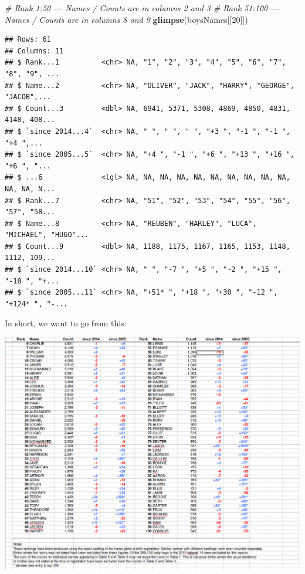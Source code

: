 \documentclass[
]{book}
\newenvironment{Shaded}{\begin{snugshade}}{\end{snugshade}}
\newcommand{\CommentTok}[1]{\textcolor[rgb]{0.56,0.35,0.01}{\textit{#1}}}
\newcommand{\DecValTok}[1]{\textcolor[rgb]{0.00,0.00,0.81}{#1}}
\newcommand{\KeywordTok}[1]{\textcolor[rgb]{0.13,0.29,0.53}{\textbf{#1}}}
\newcommand{\NormalTok}[1]{#1}
\begin{document}
\begin{Shaded}
\begin{Highlighting}[]
\CommentTok{\# Rank 1:50 {-}{-}{-} Names / Counts are in columns 2 and 3 }
\CommentTok{\# Rank 51:100 {-}{-}{-} Names / Counts are in columns 8 and 9}
\KeywordTok{glimpse}\NormalTok{(boysNames[[}\DecValTok{20}\NormalTok{]]) }
\end{Highlighting}
\end{Shaded}

\begin{verbatim}
## Rows: 61
## Columns: 11
## $ Rank...1          <chr> NA, "1", "2", "3", "4", "5", "6", "7", "8", "9", ...
## $ Name...2          <chr> NA, "OLIVER", "JACK", "HARRY", "GEORGE", "JACOB",...
## $ Count...3         <dbl> NA, 6941, 5371, 5308, 4869, 4850, 4831, 4148, 408...
## $ `since 2014...4`  <chr> NA, "­ ", "­ ", "­ ", "+3 ", "-1 ", "-1 ", "+4 ",...
## $ `since 2005...5`  <chr> NA, "+4 ", "-1 ", "+6 ", "+13 ", "+16 ", "+6 ", "...
## $ ...6              <lgl> NA, NA, NA, NA, NA, NA, NA, NA, NA, NA, NA, NA, N...
## $ Rank...7          <chr> NA, "51", "52", "53", "54", "55", "56", "57", "58...
## $ Name...8          <chr> NA, "REUBEN", "HARLEY", "LUCA", "MICHAEL", "HUGO"...
## $ Count...9         <dbl> NA, 1188, 1175, 1167, 1165, 1153, 1148, 1112, 109...
## $ `since 2014...10` <chr> NA, "­ ", "-7 ", "+5 ", "-2 ", "+15 ", "-10 ", "+...
## $ `since 2005...11` <chr> NA, "+51* ", "+18 ", "+30 ", "-12 ", "+124* ", "-...
\end{verbatim}

In short, we want to go from this:

\includegraphics{R/RDataWrangling/images/messy.png}
\end{document}

